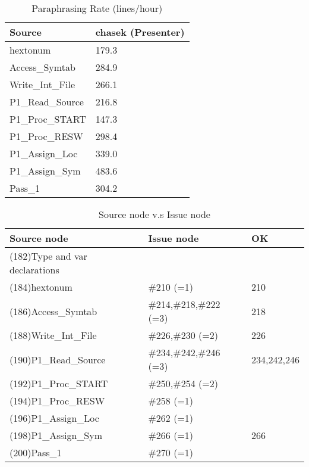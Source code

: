\begin{table}[hb]
\begin{center}
\begin{tabular}{|l|l|}
\hline
Source & chasek (Presenter)\\
\hline
hextonum & 179.3\\
Access\_Symtab & 284.9\\
Write\_Int\_File & 266.1\\
P1\_Read\_Source & 216.8\\
P1\_Proc\_START & 147.3\\
P1\_Proc\_RESW & 298.4\\
P1\_Assign\_Loc & 339.0\\
P1\_Assign\_Sym & 483.6\\
Pass\_1 & 304.2\\
\hline
\end{tabular}
\end{center}
\caption{Paraphrasing Rate (lines/hour)}
\end{table}


\begin{table}[hb]
\begin{center}
\begin{tabular}{|l|l|l|}
\hline
Source node & Issue node  & OK\\
\hline
(182)Type and var declarations &  & \\
(184)hextonum & \#210 (=1) & 210\\
(186)Access\_Symtab & \#214,\#218,\#222 (=3) & 218\\
(188)Write\_Int\_File & \#226,\#230 (=2) & 226\\
(190)P1\_Read\_Source & \#234,\#242,\#246 (=3) & 234,242,246\\
(192)P1\_Proc\_START & \#250,\#254 (=2) & \\
(194)P1\_Proc\_RESW & \#258 (=1) & \\
(196)P1\_Assign\_Loc & \#262 (=1) & \\
(198)P1\_Assign\_Sym & \#266 (=1) & 266\\
(200)Pass\_1 & \#270 (=1) & \\
\hline
\end{tabular}
\caption{Source node v.s Issue node}
\end{center}
\end{table}

